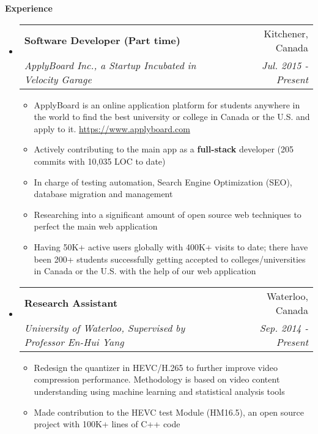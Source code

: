 \documentclass[letterpaper,10pt]{article}
\makeatletter
\newcommand{\resitem}[1]{\item #1 \vspace{-2pt}}
\newcommand{\resheading}[1]{{\large \colorbox{mygrey}{\begin{minipage}{\textwidth}{\textbf{#1 \vphantom{p\^{E}}}}\end{minipage}}}}
\newcommand{\ressubheading}[4]{
\begin{tabular*}{7.0in}{l@{\extracolsep{\fill}}r}
		\textbf{#1} & #2 \\
		\textit{#3} & \textit{#4} \\
\end{tabular*}\vspace{-6pt}}
\makeatother
\begin{document}
\resheading{Experience}
\begin{itemize}
\itemsep0em
\item
    \ressubheading{Software Developer (Part time)}{Kitchener, Canada}{ApplyBoard Inc., a Startup Incubated in Velocity Garage}{ Jul. 2015 - Present}
	\begin{itemize}
		\resitem{ApplyBoard is an online application platform for students anywhere in the world to find the best university or college in Canada or the U.S. and apply to it. \url{https://www.applyboard.com} }
        \resitem{Actively contributing to the main app as a \textbf{full-stack} developer (205 commits with 10,035 LOC to date)}
		\resitem{In charge of testing automation, Search Engine Optimization (SEO), database migration and management}
		\resitem{Researching into a significant amount of open source web techniques to perfect the main web application}
        \resitem{Having 50K+ active users globally with 400K+ visits to date; there have been 200+ students successfully getting accepted to colleges/universities in Canada or the U.S. with the help of our web application }
	\end{itemize}
\item
	\ressubheading{Research Assistant}{Waterloo, Canada}{University of Waterloo, Supervised by Professor En-Hui Yang}{Sep. 2014 - Present}
	\begin{itemize}
		\resitem{Redesign the quantizer in HEVC/H.265 to further improve video compression performance. Methodology is based on video content understanding using machine learning and statistical analysis tools}
		\resitem{Made contribution to the HEVC test Module (HM16.5), an open source project with 100K+ lines of C++ code}
	\end{itemize}
\end{itemize}
\end{document}
